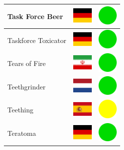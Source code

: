 \documentclass[12pt, a4paper, twoside]{report}
\begin{document}
\begin{center}
\begin{longtable}{|p{5cm}|p{2cm}|p{2cm}|}
 Task Force Beer                                            & \includegraphics[width=1cm]{../4x3/de} &   \includegraphics[width=1cm]{../likes/y} \\ \hline
 Taskforce Toxicator                                        & \includegraphics[width=1cm]{../4x3/de} &   \includegraphics[width=1cm]{../likes/y} \\ \hline
 Tears of Fire                                              & \includegraphics[width=1cm]{../4x3/ir} &   \includegraphics[width=1cm]{../likes/y} \\ \hline
 Teethgrinder                                               & \includegraphics[width=1cm]{../4x3/nl} &   \includegraphics[width=1cm]{../likes/y} \\ \hline
 Teething                                                   & \includegraphics[width=1cm]{../4x3/es} &   \includegraphics[width=1cm]{../likes/m} \\ \hline
 Teratoma                                                   & \includegraphics[width=1cm]{../4x3/de} &   \includegraphics[width=1cm]{../likes/y} \\ \hline

\end{longtable}
\end{center}
\end{document}
